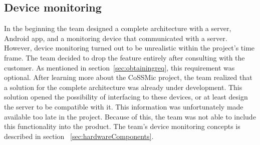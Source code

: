 \subsection{Device monitoring}
In the beginning the team designed a complete architecture with a server, Android app, and a monitoring device that communicated with a server. However, device monitoring turned out to be unrealistic within the project's time frame. The team decided to drop the feature entirely after consulting with the customer. As mentioned in section~\ref{sec:obtainingreq}, this requirement was optional.
After learning more about the CoSSMic project, the team realized that a solution for the complete architecture was already under development. This solution opened the possibility of interfacing to these devices, or at least design the server to be compatible with it. This information was unfortunately made available too late in the project. Because of this, the team was not able to include this functionality into the product. 
The team's device monitoring concepts is described in section ~\ref{sec:hardwareComponents}.



